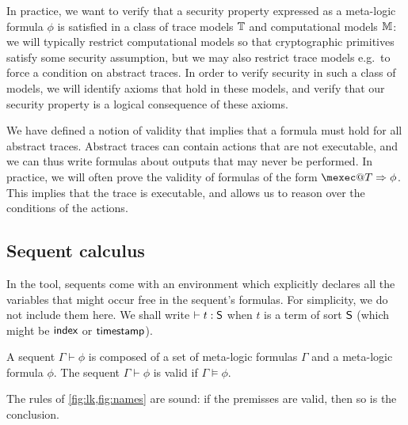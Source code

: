 In practice, we want to verify that a security property expressed as a
meta-logic formula $\phi$ is satisfied in a class of trace models
$\mathbb{T}$ and computational models $\mathbb{M}$: we will typically restrict computational
models so that cryptographic primitives satisfy some security assumption,
but we may also restrict trace models e.g.\ to force a condition on
abstract traces. In order to verify security in such a class of models,
we will identify axioms that hold in these models, and verify that our
security property is a logical consequence of these axioms.

\begin{remark}
  We have defined a notion of validity that implies that a formula must hold for all abstract traces. Abstract traces can contain actions that are not executable, and we can thus write formulas about outputs that may never be performed. In practice, we will often prove the validity of formulas of the form $\mexec@T \Rightarrow \phi$. This implies that the trace is executable, and allows us to reason over the conditions of the actions.
\end{remark}

\subsection{Sequent calculus}

In the tool, sequents come with an environment which explicitly
declares all the variables that might occur free in the sequent's formulas.
For simplicity, we do not include them here. We shall write $\vdash t:\textsf{S}$
when $t$ is a term of sort $\textsf{S}$ (which might be $\textsf{index}$ or $\textsf{timestamp}$).

\begin{definition}
  A sequent $\Gamma \vdash \phi$ is composed of a set of meta-logic formulas
  $\Gamma$ and a meta-logic formula $\phi$.
  The sequent $\Gamma \vdash \phi$ is valid if $\Gamma \models \phi$.
\end{definition}

\begin{proposition}
  The rules of \cref{fig:lk,fig:names} are sound: if the premisses are valid,
  then so is the conclusion.
\end{proposition}

